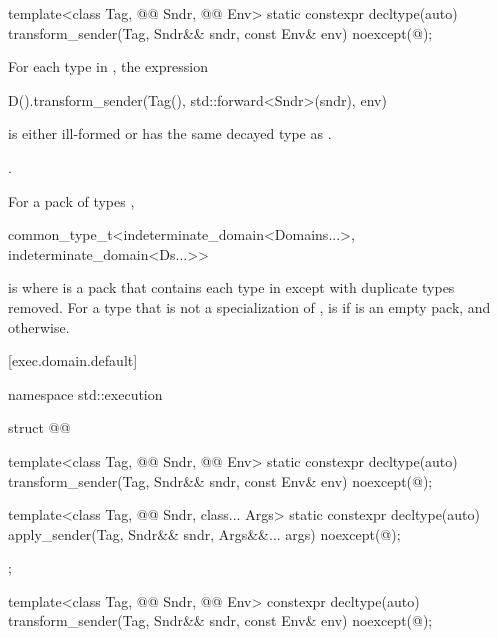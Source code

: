 %
\begin{itemdecl}
template<class Tag, @@ Sndr, @@ Env>
  static constexpr decltype(auto) transform_sender(Tag, Sndr&& sndr, const Env& env)
    noexcept(@\seebelow@);
\end{itemdecl}

\begin{itemdescr}
\pnum
\mandates
For each type  in ,
the expression
\begin{codeblock}
D().transform_sender(Tag(), std::forward<Sndr>(sndr), env)
\end{codeblock}
is either ill-formed or has the same decayed type as
.

\pnum
\returns
{}.

\pnum
\remarks
For a pack of types ,
\begin{codeblock}
common_type_t<indeterminate_domain<Domains...>, indeterminate_domain<Ds...>>
\end{codeblock}
is 
where  is a pack that contains each type in
 except with duplicate types removed.
For a type  that is not a specialization of ,
is  if  is an empty pack, and
otherwise.
\end{itemdescr}

[exec.domain.default]{}

\pnum
\begin{codeblock}
namespace std::execution {
  struct @@ {
    template<class Tag, @@ Sndr, @@ Env>
      static constexpr decltype(auto) transform_sender(Tag, Sndr&& sndr, const Env& env)
        noexcept(@\seebelow@);

    template<class Tag, @@ Sndr, class... Args>
      static constexpr decltype(auto) apply_sender(Tag, Sndr&& sndr, Args&&... args)
        noexcept(@\seebelow@);
  };
}
\end{codeblock}

%
\begin{itemdecl}
template<class Tag, @@ Sndr, @@ Env>
  constexpr decltype(auto) transform_sender(Tag, Sndr&& sndr, const Env& env)
    noexcept(@\seebelow@);
\end{itemdecl}

